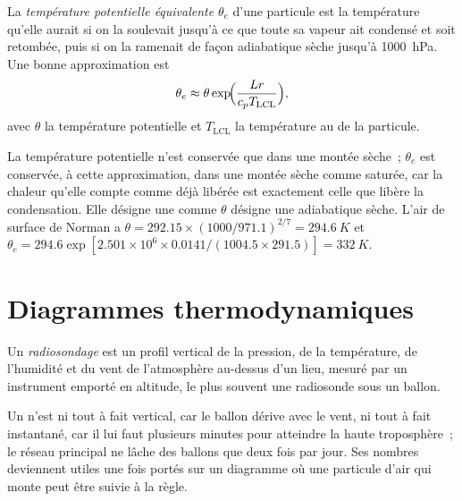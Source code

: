 \begin{definition}\label{def:b2:atmospheric-thermodynamics:theta-e}
La \emph{température potentielle équivalente} $\theta_e$ d'une particule
est la température qu'elle aurait si on la soulevait jusqu'à ce que toute sa vapeur ait condensé et soit
retombée, puis si on la ramenait de façon adiabatique sèche jusqu'à \qty{1000}{hPa}. Une bonne approximation est
\[
  \theta_e \approx \theta \exp\!\Bigl(\frac{L r}{c_p T_{\text{LCL}}}\Bigr),
\]
avec $\theta$ la température potentielle et $T_{\text{LCL}}$ la
température au  de la particule.
\end{definition}

La température potentielle n'est conservée que dans une montée sèche~; $\theta_e$ est conservée, à cette approximation,
dans une montée sèche comme saturée, car la chaleur qu'elle compte comme déjà libérée est exactement celle
que libère la condensation. Elle désigne une  comme $\theta$ désigne une adiabatique sèche.
L'air de surface de Norman a $\theta = 292.15 \times (1000/971.1)^{2/7} = \qty{294.6}{K}$ et
$\theta_e = 294.6 \exp[2.501 \times 10^6 \times 0.0141/(1004.5 \times 291.5)] = \qty{332}{K}$.

\section{Diagrammes thermodynamiques}\label{sec:b2:atmospheric-thermodynamics:diagrams}

\begin{definition}[Radiosondage]\label{def:b2:atmospheric-thermodynamics:sounding}
Un \emph{radiosondage} est un profil vertical de la pression, de
la température, de l'humidité et du vent de l'atmosphère au-dessus d'un lieu, mesuré
par un instrument emporté en altitude, le plus souvent une radiosonde sous un ballon.
\end{definition}

Un  n'est ni tout à fait vertical, car le ballon dérive avec le vent, ni tout à
fait instantané, car il lui faut plusieurs minutes pour atteindre la haute troposphère~; le
réseau principal ne lâche des ballons que deux fois par jour. Ses nombres deviennent utiles une
fois portés sur un diagramme où une particule d'air qui monte peut être suivie à la règle.

